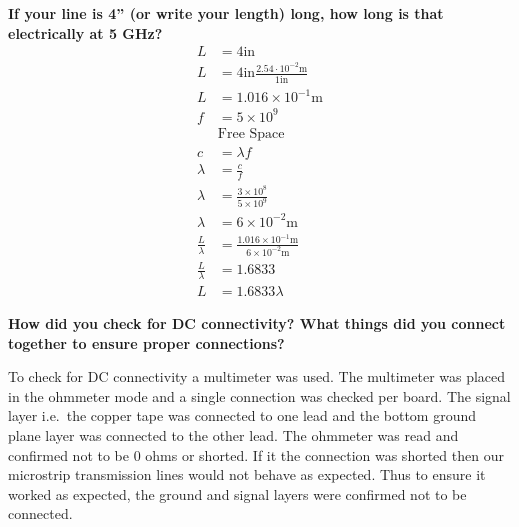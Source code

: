 \documentclass[journal]{IEEEtran}
\begin{document}
\textbf{If your line is 4” (or write your length) long, how long is that electrically at 5 GHz?}
\begin{align*}
    L                  & =4\text{in}                                                  \\
    L                  & =4\text{in}\frac{2.54\cdot 10^{-2}\text{m}}{1\text{in}}      \\
    L                  & =1.016\times 10^{-1}\text{m}                                 \\
    f                  & =5\times 10^{9}                                              \\
                       & \text{Free Space}                                            \\
    c                  & =\lambda f                                                   \\
    \lambda            & =\frac{c}{f}                                                 \\
    \lambda            & =\frac{3\times 10^{8}}{5\times 10^{9}}                       \\
    \lambda            & =6\times 10^{-2}\text{m}                                     \\
    \frac{L}{\lambda } & =\frac{1.016\times 10^{-1}\text{m}}{6\times 10^{-2}\text{m}} \\
    \frac{L}{\lambda } & =1.6833                                                      \\
    L                  & =1.6833\lambda
\end{align*}

\textbf{How did you check for DC connectivity? What things did you connect together to ensure proper connections?}

To check for DC connectivity a multimeter was used. The multimeter was placed in
the ohmmeter mode and a single connection was checked per board. The signal
layer i.e.\ the copper tape was connected to one lead and the bottom ground plane
layer was connected to the other lead. The ohmmeter was read and confirmed not
to be 0 ohms or shorted.  If it the connection was shorted then our microstrip
transmission lines would not behave as expected. Thus to ensure it worked as
expected, the ground and signal layers were confirmed not to be connected.
\end{document}
